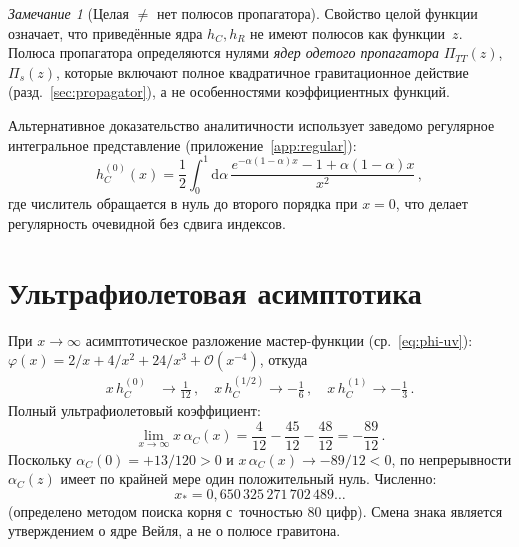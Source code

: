 \documentclass[aps,prd,twocolumn,superscriptaddress,nofootinbib,floatfix]{revtex4-2}
\theoremstyle{definition}
\theoremstyle{remark}
\newtheorem{remark}[theorem]{\cyrillicfont Замечание}
\newcommand{\dd}{\mathrm{d}}
\begin{document}
\begin{remark}[Целая $\neq$ нет полюсов пропагатора]
\label{rem:poles}
Свойство целой функции означает, что приведённые ядра $h_C, h_R$ не имеют
полюсов как функции~$z$. Полюса пропагатора определяются нулями
\emph{ядер одетого пропагатора} $\Pi_{TT}(z)$, $\Pi_s(z)$, которые
включают полное квадратичное гравитационное действие
(разд.~\ref{sec:propagator}), а не особенностями коэффициентных функций.
\end{remark}

Альтернативное доказательство аналитичности использует заведомо регулярное
интегральное представление (приложение~\ref{app:regular}):
\begin{equation}
  h_C^{(0)}(x) = \frac{1}{2}\int_0^1 \dd\alpha\,
    \frac{e^{-\alpha(1-\alpha)x} - 1 + \alpha(1-\alpha)x}{x^2}\,,
  \label{eq:hC0-regular}
\end{equation}
где числитель обращается в нуль до второго порядка при $x = 0$, что делает
регулярность очевидной без сдвига индексов.


\section{Ультрафиолетовая асимптотика}
\label{sec:uv}

При $x \to \infty$ асимптотическое разложение мастер-функции
(ср.~\eqref{eq:phi-uv}):
$\varphi(x) = 2/x + 4/x^2 + 24/x^3 + \mathcal{O}(x^{-4})$, откуда
\begin{align}
  x\,h_C^{(0)} &\to \frac{1}{12}\,,\quad
  x\,h_C^{(1/2)} \to -\frac{1}{6}\,,\quad
  x\,h_C^{(1)} \to -\frac{1}{3}\,.
\end{align}
Полный ультрафиолетовый коэффициент:
\begin{equation}
  \lim_{x\to\infty} x\,\alpha_C(x)
    = \frac{4}{12} - \frac{45}{12} - \frac{48}{12}
    = -\frac{89}{12}\,.
  \label{eq:uv-coeff}
\end{equation}
Поскольку $\alpha_C(0) = +13/120 > 0$ и
$x\,\alpha_C(x) \to -89/12 < 0$, по непрерывности $\alpha_C(z)$ имеет
по крайней мере один положительный нуль. Численно:
\begin{equation}
  x_\ast = 0{,}650\,325\,271\,702\,489\ldots
  \label{eq:xstar}
\end{equation}
(определено методом поиска корня с~точностью $80$ цифр). Смена знака
является утверждением о ядре Вейля, а не о полюсе гравитона.
\end{document}
